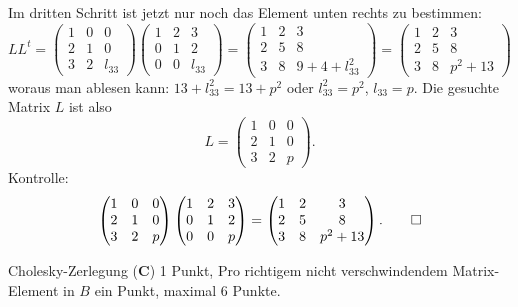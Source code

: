 \begin{loesung}
Im dritten Schritt ist jetzt nur noch das Element unten rechts zu bestimmen:
\[
LL^t=
\begin{pmatrix}
1&0&     0\\
2&1&     0\\
3&2&l_{33}
\end{pmatrix}
\begin{pmatrix}
1&2&     3\\
0&1&     2\\
0&0&l_{33}
\end{pmatrix}
=
\begin{pmatrix}
 1& 2&  3\\
 2& 5&  8\\
 3& 8&9+4+l_{33}^2
\end{pmatrix}
=
\begin{pmatrix}
 1&2&3\\
 2&5&8\\
 3&8&p^2 + 13
\end{pmatrix}
\]
woraus man ablesen kann: $13+l_{33}^2=13+p^2$ oder $l_{33}^2=p^2$, $l_{33}=p$.
Die gesuchte Matrix $L$ ist also
\[
L=
\begin{pmatrix}
1&0&0\\
2&1&0\\
3&2&p
\end{pmatrix}.
\]
Kontrolle:
\[
\begin{pmatrix}
1&0&0\\
2&1&0\\
3&2&p
\end{pmatrix}
\begin{pmatrix}
1&2&3\\
0&1&2\\
0&0&p
\end{pmatrix}
=
\begin{pmatrix}
 1&2&3\\
 2&5&8\\
 3&8&p^2 + 13
\end{pmatrix}.
\qedhere
\]
\end{loesung}

\begin{bewertung}
Cholesky-Zerlegung ({\bf C}) 1 Punkt,
Pro richtigem nicht verschwindendem Matrix-Element in $B$ ein Punkt,
maximal 6 Punkte.
\end{bewertung}

